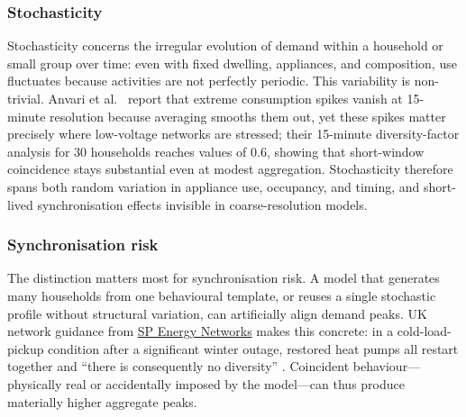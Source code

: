 \subsubsection*{Stochasticity}
Stochasticity concerns the irregular evolution of demand within a household or small group over time: even with fixed dwelling, appliances, and composition, use fluctuates because activities are not perfectly periodic. This variability is non-trivial. Anvari et al.\ \cite{anvari_et_al_2022} report that extreme consumption spikes vanish at 15-minute resolution because averaging smooths them out, yet these spikes matter precisely where low-voltage networks are stressed; their 15-minute diversity-factor analysis for 30 households reaches values of 0.6, showing that short-window coincidence stays substantial even at modest aggregation. Stochasticity therefore spans both random variation in appliance use, occupancy, and timing, and short-lived synchronisation effects invisible in coarse-resolution models.

\subsubsection*{Synchronisation risk}
The distinction matters most for synchronisation risk. A model that generates many households from one behavioural template, or reuses a single stochastic profile without structural variation, can artificially align demand peaks. UK network guidance from \href{https://www.spenergynetworks.co.uk}{SP Energy Networks} makes this concrete: in a cold-load-pickup condition after a significant winter outage, restored heat pumps all restart together and ``there is consequently no diversity'' \cite{spen_esdd_02_012_2024}. Coincident behaviour—physically real or accidentally imposed by the model—can thus produce materially higher aggregate peaks.


